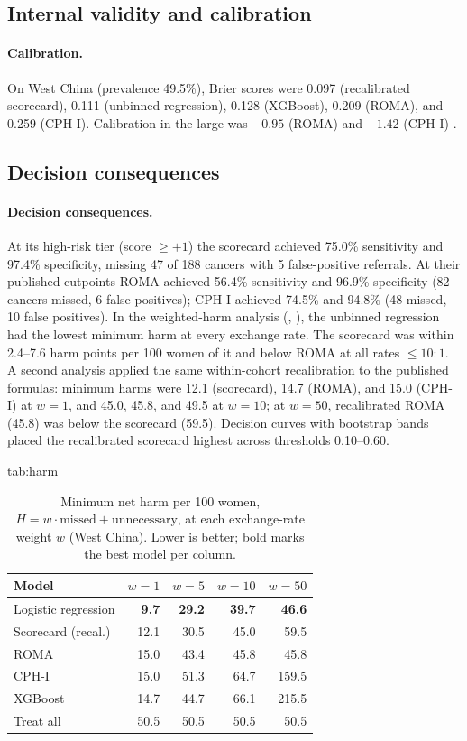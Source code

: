 \documentclass[pmlr,twocolumn,10pt]{jmlr} %
\begin{document}
\subsection{Internal validity and calibration}

\paragraph{Calibration.} On West China (prevalence 49.5\%), Brier scores were 0.097
(recalibrated scorecard), 0.111 (unbinned regression), 0.128 (XGBoost),
0.209 (ROMA), and 0.259 (CPH-I). Calibration-in-the-large was $-0.95$
(ROMA) and $-1.42$ (CPH-I) \citep{rolfsen2020}.

\subsection{Decision consequences}

\paragraph{Decision consequences.} At its high-risk tier (score $\ge+1$)
the scorecard achieved 75.0\% sensitivity and 97.4\% specificity, missing
47 of 188 cancers with 5 false-positive referrals. At their published
cutpoints ROMA achieved 56.4\% sensitivity and 96.9\% specificity (82
cancers missed, 6 false positives); CPH-I achieved 74.5\% and 94.8\% (48
missed, 10 false positives). In the weighted-harm analysis
(, ), the unbinned regression had
the lowest minimum harm at every exchange rate. The scorecard was within
2.4--7.6 harm points per 100 women of it and below ROMA at all rates
$\le10{:}1$. A second analysis applied the same within-cohort recalibration to the
published formulas: minimum harms were 12.1 (scorecard), 14.7 (ROMA), and
15.0 (CPH-I) at $w=1$, and 45.0, 45.8, and 49.5 at $w=10$; at $w=50$,
recalibrated ROMA (45.8) was below the scorecard (59.5). Decision curves with bootstrap bands placed the
recalibrated scorecard highest across thresholds 0.10--0.60.

\begin{table}[htbp]
\floatconts
  {tab:harm}
  {\caption{Minimum net harm per 100 women,
   $H=w\cdot\text{missed}+\text{unnecessary}$, at each exchange-rate
   weight $w$ (West China). Lower is better; bold marks the best model per
   column.}}
  {\setlength{\tabcolsep}{4pt}\small\begin{tabular}{lrrrr}
  \toprule
  Model & $w{=}1$ & $w{=}5$ & $w{=}10$ & $w{=}50$\\
  \midrule
  Logistic regression & \textbf{9.7} & \textbf{29.2} & \textbf{39.7} & \textbf{46.6}\\
  Scorecard (recal.) & 12.1 & 30.5 & 45.0 & 59.5\\
  ROMA & 15.0 & 43.4 & 45.8 & 45.8\\
  CPH-I & 15.0 & 51.3 & 64.7 & 159.5\\
  XGBoost & 14.7 & 44.7 & 66.1 & 215.5\\
  Treat all & 50.5 & 50.5 & 50.5 & 50.5\\
  \bottomrule
  \end{tabular}}
\end{table}
\end{document}
